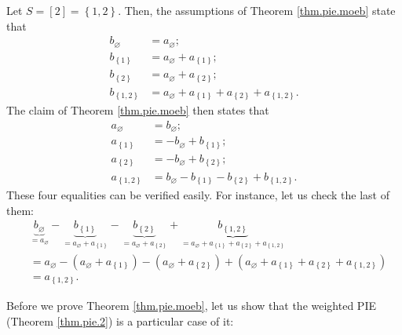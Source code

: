 \begin{example}
Let $S=\left[  2\right]  =\left\{  1,2\right\}  $. Then, the assumptions of
Theorem \ref{thm.pie.moeb} state that%
\begin{align*}
b_{\varnothing}  &  =a_{\varnothing};\\
b_{\left\{  1\right\}  }  &  =a_{\varnothing}+a_{\left\{  1\right\}  };\\
b_{\left\{  2\right\}  }  &  =a_{\varnothing}+a_{\left\{  2\right\}  };\\
b_{\left\{  1,2\right\}  }  &  =a_{\varnothing}+a_{\left\{  1\right\}
}+a_{\left\{  2\right\}  }+a_{\left\{  1,2\right\}  }.
\end{align*}
The claim of Theorem \ref{thm.pie.moeb} then states that%
\begin{align*}
a_{\varnothing}  &  =b_{\varnothing};\\
a_{\left\{  1\right\}  }  &  =-b_{\varnothing}+b_{\left\{  1\right\}  };\\
a_{\left\{  2\right\}  }  &  =-b_{\varnothing}+b_{\left\{  2\right\}  };\\
a_{\left\{  1,2\right\}  }  &  =b_{\varnothing}-b_{\left\{  1\right\}
}-b_{\left\{  2\right\}  }+b_{\left\{  1,2\right\}  }.
\end{align*}
These four equalities can be verified easily. For instance, let us check the
last of them:%
\begin{align*}
&  \underbrace{b_{\varnothing}}_{=a_{\varnothing}}-\underbrace{b_{\left\{
1\right\}  }}_{=a_{\varnothing}+a_{\left\{  1\right\}  }}%
-\underbrace{b_{\left\{  2\right\}  }}_{=a_{\varnothing}+a_{\left\{
2\right\}  }}+\underbrace{b_{\left\{  1,2\right\}  }}_{=a_{\varnothing
}+a_{\left\{  1\right\}  }+a_{\left\{  2\right\}  }+a_{\left\{  1,2\right\}
}}\\
&  =a_{\varnothing}-\left(  a_{\varnothing}+a_{\left\{  1\right\}  }\right)
-\left(  a_{\varnothing}+a_{\left\{  2\right\}  }\right)  +\left(
a_{\varnothing}+a_{\left\{  1\right\}  }+a_{\left\{  2\right\}  }+a_{\left\{
1,2\right\}  }\right) \\
&  =a_{\left\{  1,2\right\}  }.
\end{align*}

\end{example}

Before we prove Theorem \ref{thm.pie.moeb}, let us show that the weighted PIE
(Theorem \ref{thm.pie.2}) is a particular case of it:

